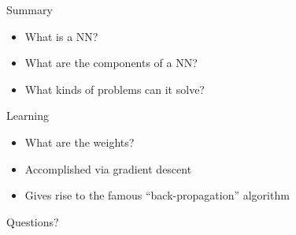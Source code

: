 \documentclass[aspectratio=169]{beamer}
\begin{document}
\begin{frame}{Summary}

\begin{itemize}
\item What is a NN?
\item What are the components of a NN?
\item What kinds of problems can it solve?
\end{itemize}
\end{frame}

\begin{frame}{Learning}

\begin{itemize}
\item What are the weights?
\item Accomplished via gradient descent
\item Gives rise to the famous ``back-propagation'' algorithm
\end{itemize}
\end{frame}
\begin{frame}{Questions?}
\end{frame}
\end{document}
